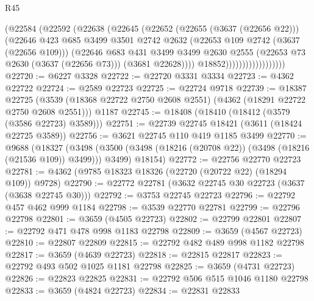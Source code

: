 \begin{lexlean}{R45}
\begin{coremodule}
                                (@22584
                                  (@22592
                                    (@22638
                                      (@22645
                                        (@22652
                                          (@22655 (@3637 (@22656 @22)))
                                          (@22646
                                            @423
                                            @685
                                            @3499
                                            @3501
                                            @2742
                                            @2632
                                            (@22653 @109 @2742 (@3637 (@22656 @109)))
                                            (@22646
                                              @683
                                              @431
                                              @3499
                                              @3499
                                              @2630
                                              @2555
                                              (@22653 @73 @2630 (@3637 (@22656 @73)))
                                              (@3681 @22628))))
                                        @18852))))))))))))))))))
@22720 := @6227 @3328
@22722 := @22720 @3331 @3334
@22723 := @4362 @22722
@22724 := @2589 @22723
@22725 := @22724 @9718
@22739 := @18387
    @22725
    (@3539 (@18368 @22722 @2750 @2608 @2551) (@4362 (@18291 @22722 @2750 @2608 @2551)))
    @1187
@22745 := @18408 (@18410 (@18412 (@3579 (@3586 @22723) @3589)))
@22751 := @22739 @22745 @18421 (@3611 (@18424 @22725 @3589))
@22756 := @3621 @22745 @110 @419 @1185 @3499
@22770 := @9688
    (@18327
      (@3498 (@3500 (@3498 (@18216 (@20708 @22)) (@3498 (@18216 (@21536 @109)) @3499))) @3499)
      @18154)
@22772 := @22756 @22770 @22723
@22781 := @4362 (@9785 @18323 @18326 (@22720 (@20722 @22) (@18294 @109)) @9728)
@22790 := @22772 @22781 (@3632 @22745 @30 @22723 (@3637 (@3638 @22745 @30)))
@22792 := @3753 @22745 @22723
@22796 := @22792 @457 @462 @999 @1184
@22798 := @3539 @22770 @22781
@22799 := @22796 @22798
@22801 := @3659 (@4505 @22723)
@22802 := @22799 @22801
@22807 := @22792 @471 @478 @998 @1183 @22798
@22809 := @3659 (@4567 @22723)
@22810 := @22807 @22809
@22815 := @22792 @482 @489 @998 @1182 @22798
@22817 := @3659 (@4639 @22723)
@22818 := @22815 @22817
@22823 := @22792 @493 @502 @1025 @1181 @22798
@22825 := @3659 (@4731 @22723)
@22826 := @22823 @22825
@22831 := @22792 @506 @515 @1046 @1180 @22798
@22833 := @3659 (@4824 @22723)
@22834 := @22831 @22833

\end{coremodule}
\end{lexlean}
